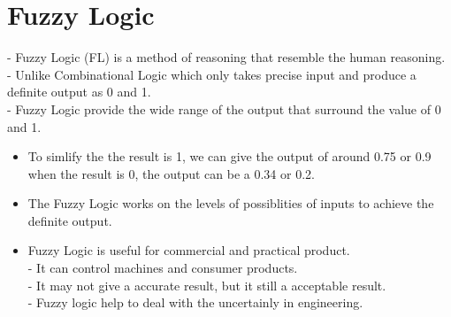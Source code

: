 \documentclass[12pt]{article}
\begin{document}
\subsection{}


\section{Fuzzy Logic}
- Fuzzy Logic (FL) is a method of reasoning that resemble the human reasoning.\\
- Unlike Combinational Logic which only takes precise input and produce a definite output as 0 and 1. \\
- Fuzzy Logic provide the wide range of the output that surround the value of 0 and 1.\\
\begin{itemize}
	\item To simlify the the result is 1, we can give the output of around 0.75 or 0.9 when the result is 0, the output can be a 0.34 or 0.2.
	\item The Fuzzy Logic works on the levels of possiblities of inputs to achieve the definite output.
	\item Fuzzy Logic is useful for commercial and practical product. \\
	- It can control machines and consumer products. \\
	- It may not give a accurate result, but it still a acceptable result. \\
	- Fuzzy logic help to deal with the uncertainly in engineering.
\end{itemize}
\end{document}
